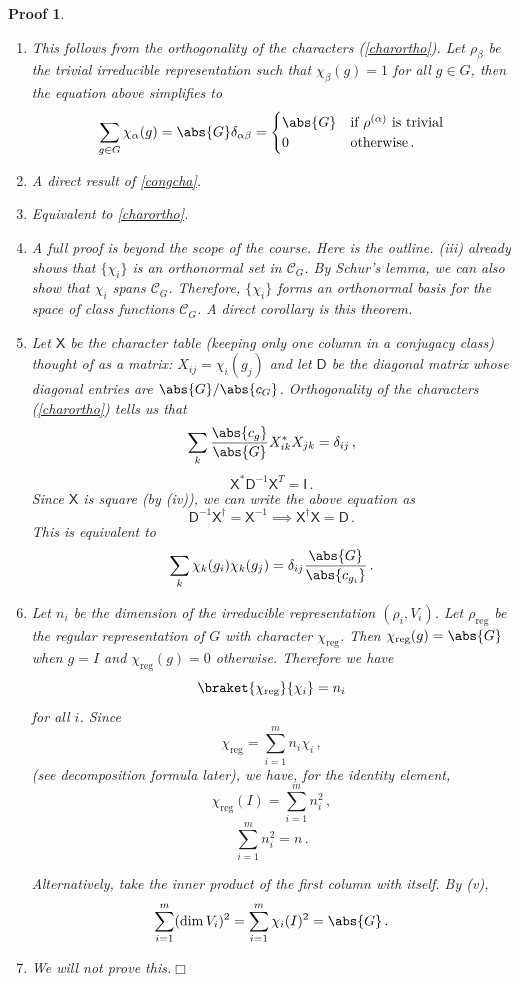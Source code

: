 \documentclass{article}
\theoremstyle{plain}\theoremheaderfont{\normalfont\itshape}\theorembodyfont{\rmfamily}\theoremseparator{.}\newtheorem*{rem}{Remark}\newtheorem*{ex}{Example}\newtheorem*{proof}{Proof}\newtheorem*{altp}{Alternative proof}
\theoremstyle{plain}\theoremheaderfont{\normalfont\bfseries}\theorembodyfont{\rmfamily}\theoremseparator{.}\newtheorem{thm}{Theorem}[section]\newtheorem{lem}[thm]{Lemma}\newtheorem{prop}[thm]{Proposition}\newtheorem*{cor}{Corollary}\newtheorem{defn}[thm]{Definition}\newtheorem{clm}[thm]{Claim}\newtheorem{clminproof}{Claim}
\theoremstyle{break}\theoremheaderfont{\normalfont\itshape}\theorembodyfont{\rmfamily}\theoremseparator{.\medskip}\newtheorem*{proofskip}{Proof}\newtheorem*{exs}{Examples}\newtheorem*{rems}{Remarks}
\theoremstyle{break}\theoremheaderfont{\normalfont\bfseries}\theorembodyfont{\rmfamily}\theoremseparator{.\medskip}\newtheorem{lemskip}[thm]{Lemma}\newtheorem{defnskip}[thm]{Definition}\newtheorem{propskip}[thm]{Proposition}\newtheorem{thmskip}[thm]{Theorem}
\numberwithin{equation}{section}
\newcommand{\qed}{\hfill\ensuremath{\Box}}
\begin{document}
	\begin{proofskip}
		\begin{enumerate}[topsep=0pt]
			\item[(i)] This follows from the orthogonality of the characters (\cref{charortho}). Let \(\rho_\beta\) be the trivial irreducible representation such that \(\chi_\beta(g)=1\) for all \(g\in G\), then the equation above simplifies to
			\[\sum_{g\in G}\chi_\alpha(g)=\abs{G}\delta_{\alpha\beta}=\begin{cases}
				\abs{G} & \text{if } \rho^{(\alpha)} \text{ is trivial}\\
				0 & \text{otherwise}\,.
			\end{cases}\]
			\item[(ii)] A direct result of \cref{congcha}.
			\item[(iii)] Equivalent to \cref{charortho}.
			\item[(iv)] A full proof is beyond the scope of the course. Here is the outline. (iii) already shows that \(\{\chi_i\}\) is an orthonormal set in \(\mathcal{C}_G\). By Schur's lemma, we can also show that \(\chi_i\) spans \(\mathcal{C}_G\). Therefore, \(\{\chi_i\}\) forms an orthonormal basis for the space of class functions \(\mathcal{C}_G\). A direct corollary is this theorem.
			\item[(v)] Let \(\mathsf{X}\) be the character table (keeping only one column in a conjugacy class) thought of as a matrix: \(X_{ij}=\chi_i(g_j)\) and let \(\mathsf{D}\) be the diagonal matrix whose diagonal entries are \(\abs{G}/\abs{c_G}\). Orthogonality of the characters (\cref{charortho}) tells us that
			\[\sum_k\frac{\abs{c_g}}{\abs{G}}X_{ik}^*X_{jk}=\delta_{ij}\,,\]
			\[\mathsf{X}^*\mathsf{D}^{-1}\mathsf{X}^T=\mathsf{I}\,.\]
			Since \(\mathsf{X}\) is square (by (iv)), we can write the above equation as
			\[\mathsf{D}^{-1}\mathsf{X}^\dagger=\mathsf{X}^{-1}\implies\mathsf{X}^\dagger\mathsf{X}=\mathsf{D}\,.\]
			This is equivalent to
			\[\sum_k\chi_k(g_i)\chi_k(g_j)=\delta_{ij}\frac{\abs{G}}{\abs{c_{g_i}}}\,.\]
			\item[(vi)] Let \(n_i\) be the dimension of the irreducible representation \((\rho_i,V_i)\). Let \(\rho_\text{reg}\) be the regular representation of \(G\) with character \(\chi_\text{reg}\). Then \(\chi_\text{reg}(g)=\abs{G}\) when \(g=I\) and \(\chi_\text{reg}(g)=0\) otherwise. Therefore we have
			\[\braket{\chi_\text{reg}}{\chi_i}=n_i\]
			for all \(i\). Since
			\[\chi_\text{reg}=\sum_{i=1}^{m}n_i\chi_i\,,\]
			(see decomposition formula later), we have, for the identity element,
			\[\chi_\text{reg}(I)=\sum_{i=1}^{m}n_i^2\,,\]
			\[\sum_{i=1}^{m}n_i^2=n\,.\]

			Alternatively, take the inner product of the first column with itself. By (v),
			\[\sum_{i=1}^{m}(\dim V_i)^2=\sum_{i=1}^{m}\chi_i(I)^2=\abs{G}\,.\]
			\item[(vii)] We will not prove this.\qed
		\end{enumerate}
	\end{proofskip}
\end{document}
